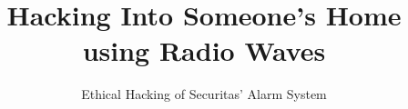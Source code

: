 \documentclass[english]{kththesis}
\title{Hacking Into Someone's Home using Radio Waves}
\subtitle{Ethical Hacking of Securitas' Alarm System}
\begin{document}

\label{pg:lastPageofPreface}

\mainmatter









\printbibliography[title=References]

\appendix
\renewcommand{\chaptermark}[1]{\markboth{Appendix \thechapter\relax:\thinspace\relax#1}{}}

\end{document}
